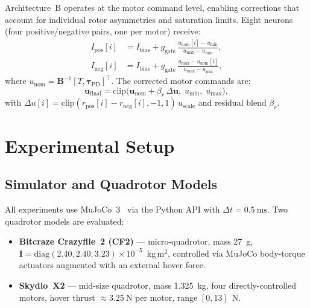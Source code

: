 \documentclass[conference]{IEEEtran}
\begin{document}
Architecture~B operates at the motor command level, enabling corrections that
account for individual rotor asymmetries and saturation limits.
Eight neurons (four positive/negative pairs, one per motor) receive:
\begin{align}
  I_{\mathrm{pos}}[i] &= I_{\mathrm{bias}} +
    g_{\mathrm{gate}}\,\frac{u_{\mathrm{nom}}[i] - u_{\min}}{u_{\max} - u_{\min}},
  \label{eq:rotor_pos}\\
  I_{\mathrm{neg}}[i] &= I_{\mathrm{bias}} +
    g_{\mathrm{gate}}\,\frac{u_{\max} - u_{\mathrm{nom}}[i]}{u_{\max} - u_{\min}},
  \label{eq:rotor_neg}
\end{align}
where $u_{\mathrm{nom}} = \mathbf{B}^{-1}[T,\boldsymbol{\tau}_{\mathrm{PD}}]^\top$.
The corrected motor commands are:
\begin{equation}
  \mathbf{u}_{\mathrm{final}} =
    \mathrm{clip}\!\bigl(\mathbf{u}_{\mathrm{nom}} + \beta_r\,\Delta\mathbf{u},\;
      u_{\min},\; u_{\max}\bigr),
  \label{eq:rotor_blend}
\end{equation}
with $\Delta u[i] = \mathrm{clip}(r_{\mathrm{pos}}[i] - r_{\mathrm{neg}}[i],-1,1)\,u_{\mathrm{scale}}$
and residual blend $\beta_r$.

\section{Experimental Setup}
\label{sec:experiments}

\subsection{Simulator and Quadrotor Models}

All experiments use MuJoCo~3~\cite{todorov2012mujoco} via the Python API with
$\Delta t = \SI{0.5}{\milli\second}$.
Two quadrotor models are evaluated:

\begin{itemize}
  \item \textbf{Bitcraze Crazyflie~2 (CF2)} --- micro-quadrotor,
        mass \SI{27}{\gram}, $\mathbf{I} = \mathrm{diag}(2.40, 2.40, 3.23)
        \times 10^{-5}$~kg\,m$^2$, controlled via MuJoCo body-torque actuators
        augmented with an external hover force.
  \item \textbf{Skydio~X2} --- mid-size quadrotor, mass \SI{1.325}{\kg},
        four directly-controlled motors, hover thrust $\approx\SI{3.25}{\N}$
        per motor, range $[0, 13]$~N.
\end{itemize}
\end{document}
